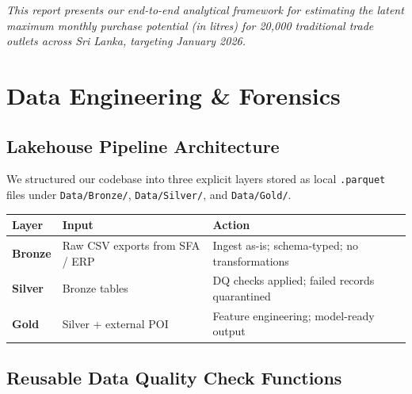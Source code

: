 \documentclass[11pt, a4paper]{article}
\begin{document}
\begin{center}
  \vspace{0.6cm}

  \begin{minipage}{0.88\linewidth}
    \small\color{midgray}\itshape
    This report presents our end-to-end analytical framework for estimating the
    latent maximum monthly purchase potential (in litres) for 20{,}000 traditional
    trade outlets across Sri Lanka, targeting January 2026.
  \end{minipage}

\end{center}

\newpage


\section{Data Engineering \& Forensics}

\subsection{Lakehouse Pipeline Architecture}

We structured our codebase into three explicit layers stored as local
\texttt{.parquet} files under \texttt{Data/Bronze/}, \texttt{Data/Silver/}, and
\texttt{Data/Gold/}.

\begin{center}
\small
\begin{tabular}{p{2.2cm} p{4.5cm} p{5.5cm}}
  \toprule
  \textbf{Layer} & \textbf{Input} & \textbf{Action} \\
  \midrule
  \textcolor{accent}{\textbf{Bronze}} &
    Raw CSV exports from SFA / ERP &
    Ingest as-is; schema-typed; no transformations \\
  \textcolor{primary}{\textbf{Silver}} &
    Bronze tables &
    DQ checks applied; failed records quarantined \\
  \textcolor{successgreen}{\textbf{Gold}} &
    Silver + external POI &
    Feature engineering; model-ready output \\
  \bottomrule
\end{tabular}
\end{center}

\subsection{Reusable Data Quality Check Functions}
\end{document}
